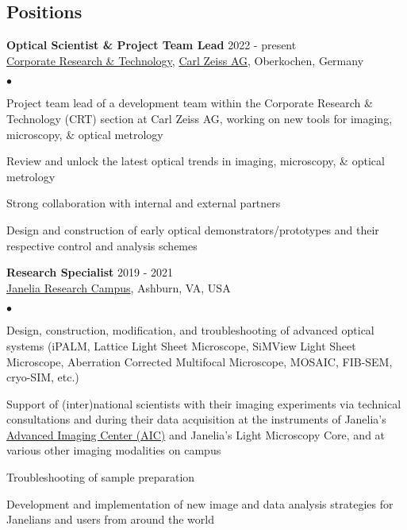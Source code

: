 \documentclass[margin,line]{res}
\newenvironment{list2}{
  \begin{list}{$\bullet$}{%
      \setlength{\itemsep}{0in}
      \setlength{\parsep}{0in} \setlength{\parskip}{0in}
      \setlength{\topsep}{0in} \setlength{\partopsep}{0in} 
      \setlength{\leftmargin}{0.2in}}}{\end{list}}
\begin{document}
\begin{resume}

\section{\sc Positions}
{\bf Optical Scientist \& Project Team Lead} \hfill {2022 - present}\\
\href{https://www.zeiss.com/corporate/int/careers/research-development-at-zeiss.html}{Corporate Research \& Technology}, \href{https://www.zeiss.de/}{Carl Zeiss AG}, Oberkochen, Germany\\
 \vspace*{-3mm}
\begin{list2}
\vspace*{-1mm}
\item Project team lead of a development team within the Corporate Research \& Technology (CRT) section at Carl Zeiss AG, working on new tools for imaging, microscopy, \& optical metrology
\item Review and unlock the latest optical trends in imaging, microscopy, \& optical metrology
\item Strong collaboration with internal and external partners 
\item Design and construction of early optical demonstrators/prototypes and their respective control and analysis schemes
\end{list2}
\vspace*{-1mm}
{\bf Research Specialist} \hfill {2019 - 2021}\\
\href{https://www.janelia.org/}{Janelia Research Campus}, Ashburn, VA, USA\\
 \vspace*{-3mm}
\begin{list2}
\vspace*{-1mm}
\item Design, construction, modification, and troubleshooting of advanced optical systems (iPALM, Lattice Light Sheet Microscope, SiMView Light Sheet Microscope, Aberration Corrected Multifocal Microscope, MOSAIC, FIB-SEM, cryo-SIM, etc.)
\item Support of (inter)national scientists with their imaging experiments via technical consultations and during their data acquisition at the instruments of Janelia's \href{https://www.aicjanelia.org/}{Advanced Imaging Center (AIC)} and Janelia's Light Microscopy Core, and at various other imaging modalities on campus
\item Troubleshooting of sample preparation
\item Development and implementation of new image and data analysis strategies for Janelians and users from around the world

\end{list2}
\end{resume}
\end{document}
